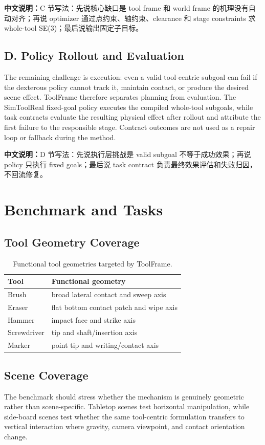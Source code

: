 \documentclass[journal]{IEEEtran}
\newcommand{\method}{ToolFrame}
\newcommand{\cn}[1]{\par\smallskip\noindent\textbf{中文说明：}#1\par\smallskip}
\begin{document}
\cn{C 节写法：先说核心缺口是 tool frame 和 world frame 的机理没有自动对齐；再说 optimizer 通过点约束、轴约束、clearance 和 stage constraints 求 whole-tool SE(3)；最后说输出固定子目标。}

\subsection{D. Policy Rollout and Evaluation}
The remaining challenge is execution: even a valid tool-centric subgoal can
fail if the dexterous policy cannot track it, maintain contact, or produce the
desired scene effect. \method{} therefore separates planning from evaluation.
The SimToolReal fixed-goal policy executes the compiled whole-tool subgoals,
while task contracts evaluate the resulting physical effect after rollout and
attribute the first failure to the responsible stage. Contract outcomes are not
used as a repair loop or fallback during the method.

\cn{D 节写法：先说执行层挑战是 valid subgoal 不等于成功效果；再说 policy 只执行 fixed goals；最后说 task contract 负责最终效果评估和失败归因，不回流修复。}

\section{Benchmark and Tasks}
\subsection{Tool Geometry Coverage}
\begin{table}[t]
\centering
\caption{Functional tool geometries targeted by \method{}.}
\begin{tabular}{ll}
\toprule
Tool & Functional geometry \\
\midrule
Brush & broad lateral contact and sweep axis \\
Eraser & flat bottom contact patch and wipe axis \\
Hammer & impact face and strike axis \\
Screwdriver & tip and shaft/insertion axis \\
Marker & point tip and writing/contact axis \\
\bottomrule
\end{tabular}
\label{tab:tools}
\end{table}

\subsection{Scene Coverage}
The benchmark should stress whether the mechanism is genuinely geometric rather
than scene-specific. Tabletop scenes test horizontal manipulation, while
side-board scenes test whether the same tool-centric formulation transfers to
vertical interaction where gravity, camera viewpoint, and contact orientation
change.
\end{document}
